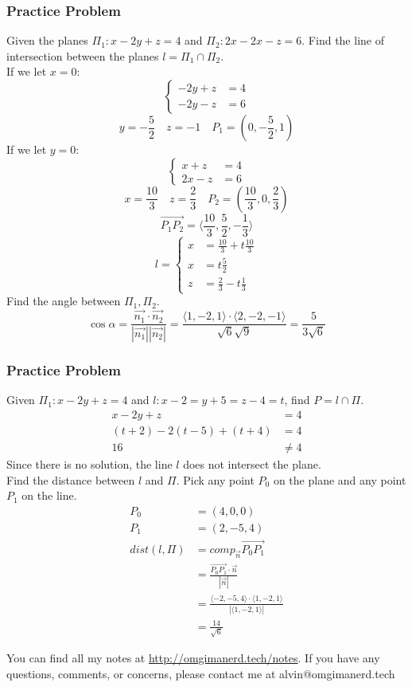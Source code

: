 \documentclass{math}
\begin{document}
\subsubsection*{Practice Problem}
Given the planes \( \Pi_1: x-2y+z = 4 \) and \( \Pi_2: 2x-2x-z = 6 \). Find the
line of intersection between the planes \( l = \Pi_1\cap\Pi_2 \). \\
If we let \( x = 0 \):
\[ \begin{cases}
  -2y+z &= 4 \\
  -2y-z &= 6
\end{cases} \]
\[ y = -\frac{5}{2} \quad z = -1 \quad P_1 = (0,-\frac{5}{2},1) \]
If we let \( y = 0 \):
\[ \begin{cases}
  x+z &= 4 \\
  2x-z &= 6
\end{cases} \]
\[ x = \frac{10}{3} \quad z = \frac{2}{3} \quad P_2 =
  (\frac{10}{3},0,\frac{2}{3}) \]
\[ \overrightarrow{P_1P_2} =
  \langle\frac{10}{3},\frac{5}{2},-\frac{1}{3}\rangle \]
\[ l = \begin{cases}
  x &= \frac{10}{3}+t\frac{10}{3} \\
  x &= t\frac{5}{2} \\
  z &= \frac{2}{3}-t\frac{1}{3}
\end{cases} \]
Find the angle between \( \Pi_1,\Pi_2 \).
\[ \cos\alpha = \frac{\vec{n_1}\cdot\vec{n_2}}{|\vec{n_1}||\vec{n_2}|} =
  \frac{\langle1,-2,1\rangle\cdot\langle2,-2,-1\rangle}{\sqrt{6}\sqrt{9}} =
  \frac{5}{3\sqrt{6}} \]

\subsubsection*{Practice Problem}
Given \( \Pi_1: x-2y+z = 4 \) and \( l: x-2 = y+5 = z-4 = t \), find
\( P = l\cap\Pi \).
\begin{align*}
  x-2y+z &= 4 \\
  (t+2)-2(t-5)+(t+4) &= 4 \\
  16 &\ne 4
\end{align*}
Since there is no solution, the line \( l \) does not intersect the plane. \\
Find the distance between \( l \) and \( \Pi \). Pick any point \( P_0 \) on
the plane and any point \( P_1 \) on the line.
\begin{align*}
  P_0 &= (4,0,0) \\
  P_1 &= (2,-5,4) \\
  dist(l,\Pi) &= comp_{\vec{n}}{\overrightarrow{P_0P_1}} \\
  &= \frac{\overrightarrow{P_0P_1}\cdot\vec{n}}{|\vec{n}|} \\
  &= \frac{\langle-2,-5,4\rangle\cdot\langle1,-2,1\rangle}
    {|\langle1,-2,1\rangle|} \\
  &= \frac{14}{\sqrt{6}}
\end{align*}

\begin{center}
  You can find all my notes at \url{http://omgimanerd.tech/notes}. If you have
  any questions, comments, or concerns, please contact me at
  alvin@omgimanerd.tech
\end{center}
\end{document}
